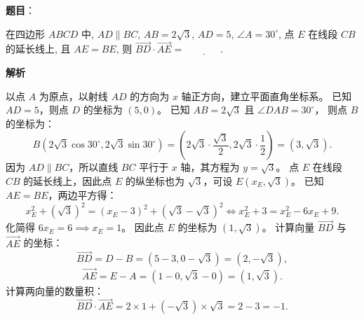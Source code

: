 \begin{answer}

\textbf{题目}：

在四边形 $ABCD$ 中, $AD \parallel BC$, $AB = 2\sqrt{3}$, $AD = 5$, $\angle A = 30^\circ$, 点 $E$ 在线段 $CB$ 的延长线上, 且 $AE = BE$, 则 $\vec{BD} \cdot \vec{AE} =$ $\underline{\phantom{XXXX}}$.

\textbf{解析}

以点 $A$ 为原点，以射线 $AD$ 的方向为 $x$ 轴正方向，建立平面直角坐标系。
已知 $AD = 5$，则点 $D$ 的坐标为 $(5, 0)$。
已知 $AB = 2\sqrt{3}$ 且 $\angle DAB = 30^\circ$，
则点 $B$ 的坐标为：
\nopagebreak[4]
\[B\left(2\sqrt{3}\cos 30^\circ, 2\sqrt{3}\sin 30^\circ\right) = \left(2\sqrt{3} \cdot \frac{\sqrt{3}}{2}, 2\sqrt{3} \cdot \frac{1}{2}\right) = (3, \sqrt{3}).\]
因为 $AD \parallel BC$，所以直线 $BC$ 平行于 $x$ 轴，其方程为 $y = \sqrt{3}$。
点 $E$ 在线段 $CB$ 的延长线上，因此点 $E$ 的纵坐标也为 $\sqrt{3}$，可设 $E(x_E, \sqrt{3})$。
已知 $AE = BE$，两边平方得：
\nopagebreak[4]
\[x_E^2 + (\sqrt{3})^2 = (x_E - 3)^2 + (\sqrt{3} - \sqrt{3})^2 \iff x_E^2 + 3 = x_E^2 - 6x_E + 9.\]
化简得 $6x_E = 6 \implies x_E = 1$。
因此点 $E$ 的坐标为 $(1, \sqrt{3})$。
计算向量 $\vec{BD}$ 与 $\vec{AE}$ 的坐标：
\nopagebreak[4]
\[\vec{BD} = D - B = (5 - 3, 0 - \sqrt{3}) = (2, -\sqrt{3}),\]
\nopagebreak[4]
\[\vec{AE} = E - A = (1 - 0, \sqrt{3} - 0) = (1, \sqrt{3}).\]
计算两向量的数量积：
\nopagebreak[4]
\[\vec{BD} \cdot \vec{AE} = 2 \times 1 + (-\sqrt{3}) \times \sqrt{3} = 2 - 3 = -1.\]


\par\medskip

\end{answer}

